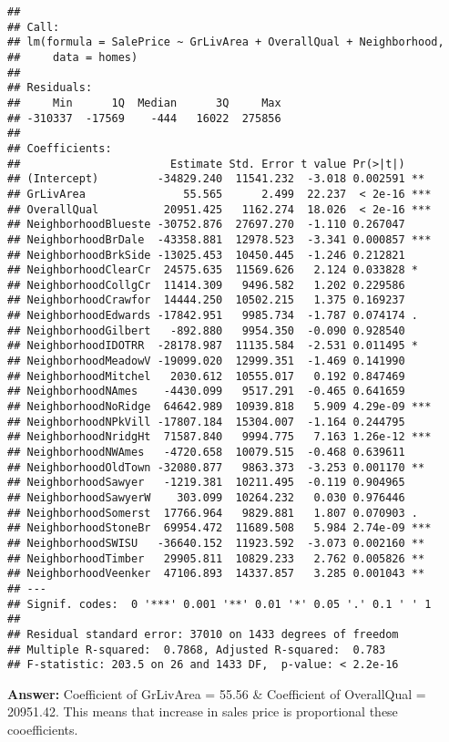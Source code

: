 \documentclass[]{article}
\begin{document}
\begin{verbatim}
## 
## Call:
## lm(formula = SalePrice ~ GrLivArea + OverallQual + Neighborhood, 
##     data = homes)
## 
## Residuals:
##     Min      1Q  Median      3Q     Max 
## -310337  -17569    -444   16022  275856 
## 
## Coefficients:
##                       Estimate Std. Error t value Pr(>|t|)    
## (Intercept)         -34829.240  11541.232  -3.018 0.002591 ** 
## GrLivArea               55.565      2.499  22.237  < 2e-16 ***
## OverallQual          20951.425   1162.274  18.026  < 2e-16 ***
## NeighborhoodBlueste -30752.876  27697.270  -1.110 0.267047    
## NeighborhoodBrDale  -43358.881  12978.523  -3.341 0.000857 ***
## NeighborhoodBrkSide -13025.453  10450.445  -1.246 0.212821    
## NeighborhoodClearCr  24575.635  11569.626   2.124 0.033828 *  
## NeighborhoodCollgCr  11414.309   9496.582   1.202 0.229586    
## NeighborhoodCrawfor  14444.250  10502.215   1.375 0.169237    
## NeighborhoodEdwards -17842.951   9985.734  -1.787 0.074174 .  
## NeighborhoodGilbert   -892.880   9954.350  -0.090 0.928540    
## NeighborhoodIDOTRR  -28178.987  11135.584  -2.531 0.011495 *  
## NeighborhoodMeadowV -19099.020  12999.351  -1.469 0.141990    
## NeighborhoodMitchel   2030.612  10555.017   0.192 0.847469    
## NeighborhoodNAmes    -4430.099   9517.291  -0.465 0.641659    
## NeighborhoodNoRidge  64642.989  10939.818   5.909 4.29e-09 ***
## NeighborhoodNPkVill -17807.184  15304.007  -1.164 0.244795    
## NeighborhoodNridgHt  71587.840   9994.775   7.163 1.26e-12 ***
## NeighborhoodNWAmes   -4720.658  10079.515  -0.468 0.639611    
## NeighborhoodOldTown -32080.877   9863.373  -3.253 0.001170 ** 
## NeighborhoodSawyer   -1219.381  10211.495  -0.119 0.904965    
## NeighborhoodSawyerW    303.099  10264.232   0.030 0.976446    
## NeighborhoodSomerst  17766.964   9829.881   1.807 0.070903 .  
## NeighborhoodStoneBr  69954.472  11689.508   5.984 2.74e-09 ***
## NeighborhoodSWISU   -36640.152  11923.592  -3.073 0.002160 ** 
## NeighborhoodTimber   29905.811  10829.233   2.762 0.005826 ** 
## NeighborhoodVeenker  47106.893  14337.857   3.285 0.001043 ** 
## ---
## Signif. codes:  0 '***' 0.001 '**' 0.01 '*' 0.05 '.' 0.1 ' ' 1
## 
## Residual standard error: 37010 on 1433 degrees of freedom
## Multiple R-squared:  0.7868, Adjusted R-squared:  0.783 
## F-statistic: 203.5 on 26 and 1433 DF,  p-value: < 2.2e-16
\end{verbatim}

\textbf{Answer:} Coefficient of GrLivArea = 55.56 \& Coefficient of
OverallQual = 20951.42. This means that increase in sales price is
proportional these cooefficients.
\end{document}
